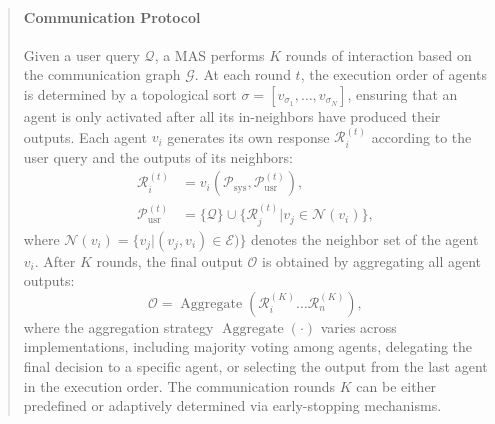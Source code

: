 \documentclass[11pt]{article}
\begin{document}
\begin{abstract}
\paragraph{{Communication Protocol}}
Given a user query $\mathcal{Q}$, a MAS performs $K$ rounds of interaction based on the communication graph $\mathcal{G}$. At each round $t$, the execution order of agents is determined by a topological sort $\sigma = [v_{\sigma_1}, \dots, v_{\sigma_N}]$, ensuring that an agent is only activated after all its in-neighbors have produced their outputs. Each agent $v_{i}$ generates its own response $\mathcal{R}_{i}^{(t)}$ according to the user query and the outputs of its neighbors:
\begin{align} \label{mp_in_multi-agent}
    \mathcal{R}_{i}^{(t)} &= v_{i}(\mathcal{P}_{\text{sys}},\mathcal{P}^{(t)}_{\text{usr}}), \\
    \mathcal{P}^{(t)}_{\text{usr}}&=\{\mathcal{Q}\} \cup \{\mathcal{R}_{j}^{(t)} | v_j\in \mathcal{N}(v_{i})\}, \nonumber
\end{align}
where $\mathcal{N}(v_{i})=\{v_j|(v_j,v_i)\in \mathcal{E})\}$ denotes the neighbor set of the agent $v_{i}$. After $K$ rounds, the final output $\mathcal{O}$ is obtained by aggregating all agent outputs:
\begin{equation}
    \mathcal{O} = \operatorname{Aggregate}(\mathcal{R}_{i}^{(K)} \dots \mathcal{R}_{n}^{(K)}),
\end{equation}
\noindent where the aggregation strategy $\operatorname{Aggregate}(\cdot)$ varies across implementations, including majority voting among agents, delegating the final decision to a specific agent, or selecting the output from the last agent in the execution order. The communication rounds $K$ can be either predefined or adaptively determined via early-stopping mechanisms.

\end{abstract}
\end{document}
